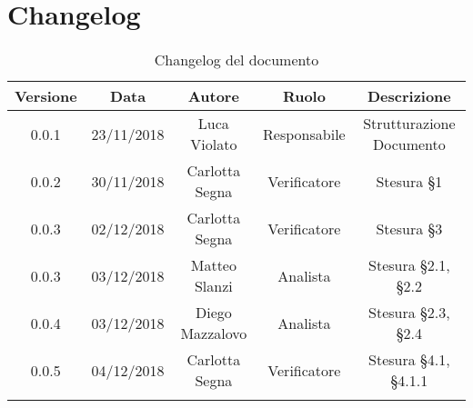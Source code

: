 \section{Changelog}

\begin{center}
\begin{longtable}{|c|c|c|c|c|}
\hline
\textbf{Versione} & \textbf{Data} & \textbf{Autore} & \textbf{Ruolo} & \textbf{Descrizione} \\
\hline \hline
\endfirsthead
0.0.1 & 23/11/2018 & Luca Violato & Responsabile & Strutturazione Documento \\
0.0.2 & 30/11/2018 & Carlotta Segna & Verificatore & Stesura §1 \\
0.0.3 & 02/12/2018 & Carlotta Segna & Verificatore & Stesura §3 \\
0.0.3 & 03/12/2018 & Matteo Slanzi & Analista & Stesura §2.1, §2.2 \\
0.0.4 & 03/12/2018 & Diego Mazzalovo & Analista & Stesura §2.3, §2.4\\
0.0.5 & 04/12/2018 & Carlotta Segna & Verificatore & Stesura §4.1, §4.1.1 \\

\hline
\caption{Changelog del documento}
\end{longtable}
\end{center}